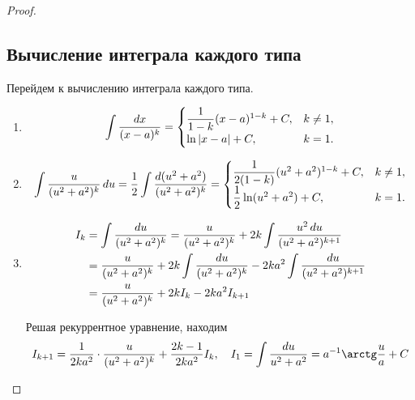 \documentclass[a4paper]{article}
\theoremstyle{named}
\renewcommand{\int}{\intop}
\begin{document}
\begin{proof}
            \subsection{Вычисление интеграла каждого типа}

            Перейдем к вычислению интеграла каждого типа.

            \begin{enumerate}
            \item
                \begin{equation*}
                    \int \dfrac{\dd x}{(x - a)^k} = \begin{cases}
                        \dfrac{1}{1 - k}(x - a)^{1 - k} + C, &k \neq 1, \\
                        \ln |x - a| + C, &k = 1.
                    \end{cases}
                \end{equation*}

            \item
                \begin{equation*}
                    \int \dfrac{u}{(u^2 + a^2)^k} \dd u
                    = \dfrac{1}{2} \int \dfrac{\dd (u^2 + a^2)}{(u^2 + a^2)^k}
                    = \begin{cases}
                        \dfrac{1}{2(1 - k)}(u^2 + a^2)^{1 - k} + C, &k \neq 1, \\
                        \dfrac{1}{2} \ln(u^2 + a^2) + C, &k = 1.
                    \end{cases}
                \end{equation*}

            \item
                \begin{align*}
                    I_k 
                    &= \int \dfrac{\dd u}{(u^2 + a^2)^k}
                    = \dfrac{u}{(u^2 + a^2)^k} + 2k \int \dfrac{u^2 \dd u}{(u^2 + a^2)^{k + 1}} \\
                    &= \dfrac{u}{(u^2 + a^2)^k} + 2k \int \dfrac{\dd u}{(u^2 + a^2)^k} - 2ka^2 \int \dfrac{\dd u}{(u^2 + a^2)^{k + 1}} \\
                    &= \dfrac{u}{(u^2 + a^2)^k} + 2kI_k - 2ka^2I_{k + 1}
                \end{align*}

                Решая рекуррентное уравнение, находим
                \begin{equation*}
                    I_{k + 1} = \dfrac{1}{2ka^2} \cdot \dfrac{u}{(u^2 + a^2)^k} + \dfrac{2k - 1}{2ka^2}I_k, \quad
                    I_1 = \int \dfrac{\dd u}{u^2 + a^2} = a^{-1} \arctg \dfrac{u}{a} + C
                \end{equation*}
            \end{enumerate}
        \end{proof}
\end{document}
